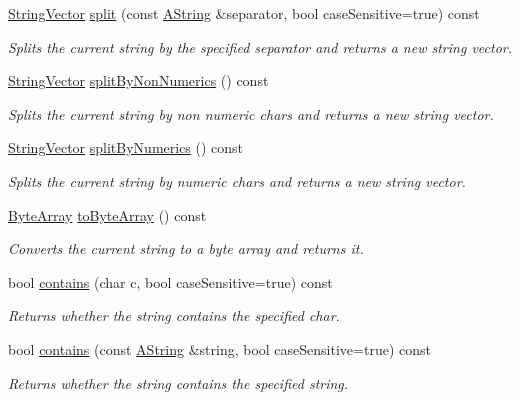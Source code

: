 \begin{DoxyCompactItemize}
\mbox{\hyperlink{class_string_vector}{String\+Vector}} \mbox{\hyperlink{class_a_string_a08266b27ed113b4a844b8eb9947b3e02}{split}} (const \mbox{\hyperlink{class_a_string}{A\+String}} \&separator, bool case\+Sensitive=true) const
\begin{DoxyCompactList}\small\item\em Splits the current string by the specified separator and returns a new string vector. \end{DoxyCompactList}\item 
\mbox{\hyperlink{class_string_vector}{String\+Vector}} \mbox{\hyperlink{class_a_string_a16ed628b786ec5d4b570df1249637ef9}{split\+By\+Non\+Numerics}} () const
\begin{DoxyCompactList}\small\item\em Splits the current string by non numeric chars and returns a new string vector. \end{DoxyCompactList}\item 
\mbox{\hyperlink{class_string_vector}{String\+Vector}} \mbox{\hyperlink{class_a_string_aaae243575004e5091025cacf9313ea76}{split\+By\+Numerics}} () const
\begin{DoxyCompactList}\small\item\em Splits the current string by numeric chars and returns a new string vector. \end{DoxyCompactList}\item 
\mbox{\hyperlink{class_byte_array}{Byte\+Array}} \mbox{\hyperlink{class_a_string_ae9d0a67c87c20152d5ab770ad1b955ac}{to\+Byte\+Array}} () const
\begin{DoxyCompactList}\small\item\em Converts the current string to a byte array and returns it. \end{DoxyCompactList}\item 
bool \mbox{\hyperlink{class_a_string_aec4ad61af8cd225bda08719550ec8e72}{contains}} (char c, bool case\+Sensitive=true) const
\begin{DoxyCompactList}\small\item\em Returns whether the string contains the specified char. \end{DoxyCompactList}\item 
bool \mbox{\hyperlink{class_a_string_abe6a9966ef157e0584c279377b6c9987}{contains}} (const \mbox{\hyperlink{class_a_string}{A\+String}} \&string, bool case\+Sensitive=true) const
\begin{DoxyCompactList}\small\item\em Returns whether the string contains the specified string. \end{DoxyCompactList}\item 

\end{DoxyCompactItemize}
